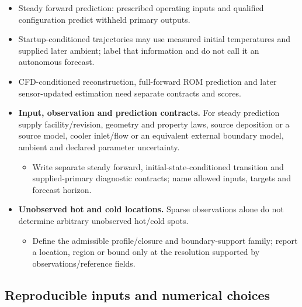 \begin{itemize}[leftmargin=*]
\item Steady forward prediction: prescribed operating inputs and qualified configuration predict withheld primary outputs.
\item Startup-conditioned trajectories may use measured initial temperatures and supplied later ambient; label that information and do not call it an autonomous forecast.
\item CFD-conditioned reconstruction, full-forward ROM prediction and later sensor-updated estimation need separate contracts and scores.

\item {}\textbf{Input, observation and prediction contracts.} For steady prediction supply facility/\allowbreak{}revision, geometry and property laws, source deposition or a source model, cooler inlet/\allowbreak{}flow or an equivalent external boundary model, ambient and declared parameter uncertainty.\cite{kapteyn2021digitaltwins}
\begin{itemize}
\item Write separate steady forward, initial-state-conditioned transition and supplied-primary diagnostic contracts; name allowed inputs, targets and forecast horizon.
\end{itemize}
\item {}\textbf{Unobserved hot and cold locations.} Sparse observations alone do not determine arbitrary unobserved hot/\allowbreak{}cold spots.\cite{oliver2014unobserved}
\begin{itemize}
\item Define the admissible profile/\allowbreak{}closure and boundary-support family; report a location, region or bound only at the resolution supported by observations/\allowbreak{}reference fields.
\end{itemize}
\end{itemize}

\subsection{Reproducible inputs and numerical choices}\label{subsec:reproducible-inputs-and-numerical-choices}


